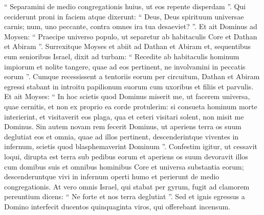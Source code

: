 \begin{biblechapter}
\begin{biblechapter}
\begin{biblechapter}
\begin{biblechapter}
\begin{biblechapter}
\begin{biblechapter}
\begin{biblechapter}
\begin{biblechapter}
\begin{biblechapter}
\begin{biblechapter}
\begin{biblechapter}
\begin{biblechapter}
\begin{biblechapter}
\begin{biblechapter}
\begin{biblechapter}
\begin{biblechapter}
\verse “ Separamini de medio congregationis huius, ut eos repente disperdam ”. 
\verse Qui ceciderunt proni in faciem atque dixerunt: “ Deus, Deus spirituum universae carnis; num, uno peccante, contra omnes ira tua desaeviet? ”. 
\verse Et ait Dominus ad Moysen: 
 \verse “ Praecipe universo populo, ut separetur ab habitaculis Core et Dathan et Abiram ”.
 \verse Surrexitque Moyses et abiit ad Dathan et Abiram et, sequentibus eum senioribus Israel, 
\verse dixit ad turbam: “ Recedite ab habitaculis hominum impiorum et nolite tangere, quae ad eos pertinent, ne involvamini in peccatis eorum ”. 
\verse Cumque recessissent a tentoriis eorum per circuitum, Dathan et Abiram egressi stabant in introitu papilionum suorum cum uxoribus et filiis et parvulis.
 \verse Et ait Moyses: “ In hoc scietis quod Dominus miserit me, ut facerem universa, quae cernitis, et non ex proprio ea corde protulerim: 
\verse si consueta hominum morte interierint, et visitaverit eos plaga, qua et ceteri visitari solent, non misit me Dominus. 
\verse Sin autem novam rem fecerit Dominus, ut aperiens terra os suum deglutiat eos et omnia, quae ad illos pertinent, descenderintque viventes in infernum, scietis quod blasphemaverint Dominum ”.
 \verse Confestim igitur, ut cessavit loqui, dirupta est terra sub pedibus eorum 
 \verse et aperiens os suum devoravit illos cum domibus suis et omnibus hominibus Core et universa substantia eorum; 
\verse descenderuntque vivi in infernum operti humo et perierunt de medio congregationis. 
\verse At vero omnis Israel, qui stabat per gyrum, fugit ad clamorem pereuntium dicens: “ Ne forte et nos terra deglutiat ”. 
\verse Sed et ignis egressus a Domino interfecit ducentos quinquaginta viros, qui offerebant incensum.
 

\end{biblechapter}
\end{biblechapter}
\end{biblechapter}
\end{biblechapter}
\end{biblechapter}
\end{biblechapter}
\end{biblechapter}
\end{biblechapter}
\end{biblechapter}
\end{biblechapter}
\end{biblechapter}
\end{biblechapter}
\end{biblechapter}
\end{biblechapter}
\end{biblechapter}
\end{biblechapter}
